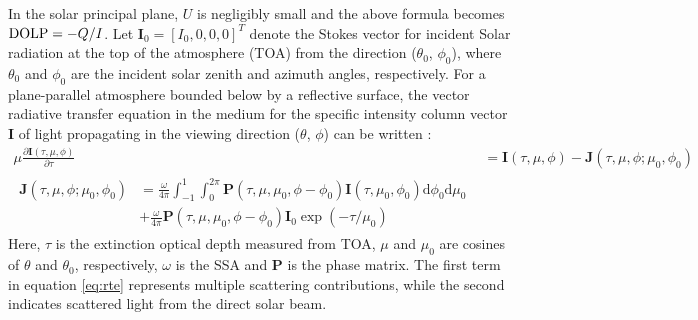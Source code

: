 In the solar principal plane, $U$ is negligibly small and the above formula
becomes $\text{DOLP}=-Q/I$. Let $\mathbf{I}_0=[I_0,0,0,0]^T$ denote the Stokes vector 
for incident Solar radiation at the top of the atmosphere (TOA) from 
the direction ($\theta_0$, $\phi_0$), where $\theta_0$ and $\phi_0$
are the incident solar zenith and azimuth angles, respectively.
For a plane-parallel atmosphere bounded below by a reflective surface, the
vector radiative transfer equation in the medium for the specific intensity
column vector $\mathbf{I}$ of light propagating in the viewing direction 
($\theta$, $\phi$) can be written \citep{Hovenier04, Mishchenko02}:
\begin{align}
\mu \frac{\partial \mathbf{I}(\tau,\mu,\phi)}{\partial \tau} &=
    \mathbf{I}(\tau,\mu,\phi) - \mathbf{J}(\tau,\mu,\phi; \mu_0, \phi_0)
    \label{eq:rte} \\
\begin{split}
\mathbf{J}(\tau,\mu,\phi; \mu_0, \phi_0) &= 
     \frac{\omega}{4\pi}\int_{-1}^{1}\int_{0}^{2\pi} 
     \mathbf{P}(\tau,\mu,\mu_0,\phi-\phi_0) 
     \mathbf{I}(\tau,\mu_0,\phi_0)\text{d}\phi_0\text{d}\mu_0  \\
     & + \frac{\omega}{4\pi}\mathbf{P}(\tau,\mu,\mu_0,\phi-\phi_0)
     \mathbf{I}_0 \exp(-\tau/\mu_0)
\end{split}
\end{align}
Here, $\tau$ is the extinction optical depth measured from TOA, $\mu$ and
$\mu_0$ are cosines of $\theta$ and $\theta_0$, respectively, $\omega$ is the
SSA and $\mathbf{P}$ is the phase matrix. The first term in equation
\eqref{eq:rte} represents multiple scattering contributions, while
the second indicates scattered light from the direct solar beam. 

